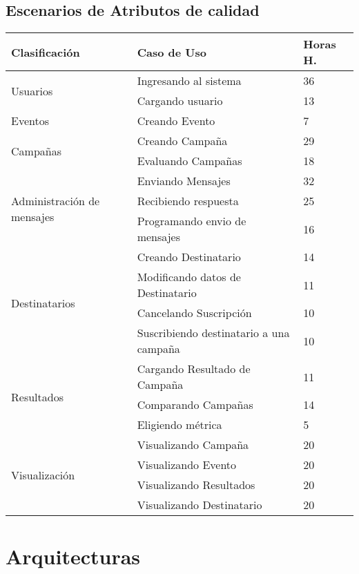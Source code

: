 \documentclass[a4paper, 11pt]{article}
\begin{document}
\subsection{Escenarios de Atributos de calidad}
\begin{table}[H]
\centering
\begin{tabular}{ | p{5cm} | p{8cm} | p{1.5cm} | }
\hline
Clasificación & Caso de Uso & Horas H.\\ \hline \hline
\multirow{2}{5cm}{Usuarios} & Ingresando al sistema & 36 \\ \cline{2-3}
& Cargando usuario & 13 \\ \hline
Eventos & Creando Evento & 7 \\ \hline
\multirow{2}{5cm}{Campañas} & Creando Campaña & 29 \\ \cline{2-3}
& Evaluando Campañas & 18 \\ \hline
\multirow{3}{5cm}{Administración de mensajes} & Enviando Mensajes & 32 \\ \cline{2-3}
& Recibiendo respuesta & 25 \\ \cline{2-3}
& Programando envio de mensajes & 16 \\ \hline
\multirow{4}{5cm}{Destinatarios} & Creando Destinatario & 14 \\  \cline{2-3}
& Modificando datos de Destinatario & 11 \\ \cline{2-3}
& Cancelando Suscripci\'on & 10 \\ \cline{2-3}
& Suscribiendo destinatario a una campaña & 10 \\ \hline
\multirow{3}{5cm}{Resultados} & Cargando Resultado de Campaña & 11 \\ \cline{2-3}
& Comparando Campañas & 14 \\ \cline{2-3}
& Eligiendo métrica & 5 \\ \hline
\multirow{4}{5cm}{Visualización} & Visualizando Campaña & 20 \\ \cline{2-3}
& Visualizando Evento & 20 \\ \cline{2-3}
& Visualizando Resultados & 20 \\ \cline{2-3}
& Visualizando Destinatario & 20 \\ \hline

\end{tabular}
\end{table}


\newpage

\section{Arquitecturas}
\end{document}
